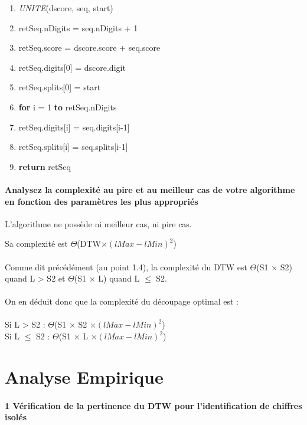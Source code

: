 \documentclass[a4paper,11pt]{article}
\begin{document}
\begin{center}
\vspace{1cm}

\begin{enumerate}
\large
\item[] \textit{UNITE}(dscore, seq, start)
\item
	retSeq.nDigits = seq.nDigits + 1
\item
	retSeq.score = dscore.score + seq.score
\item
	retSeq.digits[0] = dscore.digit
\item
	retSeq.splits[0] = start
\item
	\textbf{for} i = 1 \textbf{to} retSeq.nDigits
\item \hspace{1cm}
		retSeq.digits[i] = seq.digits[i-1]
	\item \hspace{1cm}
		retSeq.splits[i] = seq.splits[i-1]
\item \textbf{return} retSeq
\end{enumerate}
\end{center}

\subsection{Analysez la complexité au pire et au meilleur cas de votre algorithme en fonction des paramètres les plus appropriés}

L'algorithme ne possède ni meilleur cas, ni pire cas.

Sa complexité est $\Theta$(DTW$\times$$(lMax-lMin)^{2}$)
\\
\\
Comme dit précédément (au point 1.4), la complexité du DTW est $\Theta$(S1 $\times$ S2) quand L > S2 et $\Theta$(S1 $\times$ L) quand L $\le$ S2.
\\
\\
On en déduit donc que la complexité du découpage optimal est :
\\
\\
Si L > S2 : $\Theta$(S1 $\times$ S2 $\times$$(lMax-lMin)^{2}$)
\\
Si L $\le$ S2 : $\Theta$(S1 $\times$ L $\times$$(lMax-lMin)^{2}$)

\part{Analyse Empirique}

\subsection*{1 Vérification de la pertinence du DTW pour l'identification de chiffres isolés}
\end{document}

